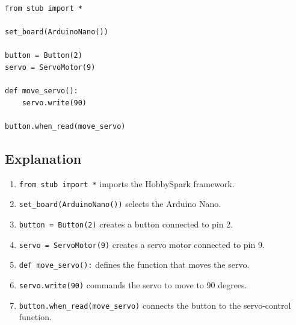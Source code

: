 \begin{lstlisting}
from stub import *

set_board(ArduinoNano())

button = Button(2)
servo = ServoMotor(9)

def move_servo():
    servo.write(90)

button.when_read(move_servo)
\end{lstlisting}

\subsection{Explanation}

\begin{enumerate}
    \item \texttt{from stub import *} imports the HobbySpark framework.

    \item \texttt{set\_board(ArduinoNano())} selects the Arduino Nano.

    \item \texttt{button = Button(2)} creates a button connected to pin 2.

    \item \texttt{servo = ServoMotor(9)} creates a servo motor connected to
    pin 9.

    \item \texttt{def move\_servo():} defines the function that moves the
    servo.

    \item \texttt{servo.write(90)} commands the servo to move to 90 degrees.

    \item \texttt{button.when\_read(move\_servo)} connects the button to
    the servo-control function.
\end{enumerate}
